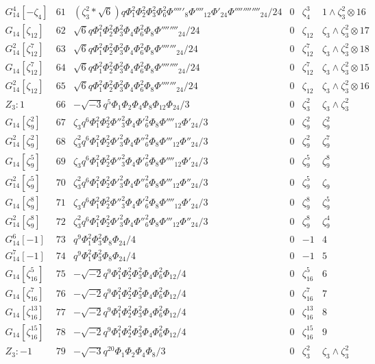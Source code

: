 \documentclass{article}
\begin{document}
$$\begin{array}{c|ccccc}
G_{14}^4[-\zeta_4]&61&(\zeta_3^2*\sqrt{6})q\Phi_1^2\Phi_2^2\Phi_3^2\Phi_6^2\Phi'''''_8\Phi''''_{12}\Phi'_{24}\Phi''''''''''''_{24}/24&0&\zeta_4^3&1\!\wedge\!\zeta_3^2\otimes16\\
G_{14}[\zeta_{12}]&62&\sqrt{6}q\Phi_1^2\Phi_2^2\Phi_3^2\Phi_4\Phi_6^2\Phi_8\Phi''''''''_{24}/24&0&\zeta_{12}&\zeta_3\!\wedge\!\zeta_3^2\otimes17\\
G_{14}^2[\zeta_{12}^7]&63&\sqrt{6}q\Phi_1^2\Phi_2^2\Phi_3^2\Phi_4\Phi_6^2\Phi_8\Phi'''''''_{24}/24&0&\zeta_{12}^7&\zeta_3\!\wedge\!\zeta_3^2\otimes18\\
G_{14}[\zeta_{12}^7]&64&\sqrt{6}q\Phi_1^2\Phi_2^2\Phi_3^2\Phi_4\Phi_6^2\Phi_8\Phi''''''''_{24}/24&0&\zeta_{12}^7&\zeta_3\!\wedge\!\zeta_3^2\otimes15\\
G_{14}^2[\zeta_{12}]&65&\sqrt{6}q\Phi_1^2\Phi_2^2\Phi_3^2\Phi_4\Phi_6^2\Phi_8\Phi'''''''_{24}/24&0&\zeta_{12}&\zeta_3\!\wedge\!\zeta_3^2\otimes16\\
Z_3:1&66&-\sqrt{-3}q^5\Phi_1\Phi_2\Phi_4\Phi_8\Phi_{12}\Phi_{24}/3&0&\zeta_3^2&\zeta_3\!\wedge\!\zeta_3^2\\
G_{14}[\zeta_9^2]&67&\zeta_3q^6\Phi_1^2\Phi_2^2\Phi''_3^2\Phi_4\Phi'_6^2\Phi_8\Phi''''_{12}\Phi'_{24}/3&0&\zeta_9^2&\zeta_9^2\\
G_{14}^2[\zeta_9^2]&68&\zeta_3^2q^6\Phi_1^2\Phi_2^2\Phi'_3^2\Phi_4\Phi''_6^2\Phi_8\Phi'''_{12}\Phi''_{24}/3&0&\zeta_9^2&\zeta_9^7\\
G_{14}[\zeta_9^5]&69&\zeta_3q^6\Phi_1^2\Phi_2^2\Phi''_3^2\Phi_4\Phi'_6^2\Phi_8\Phi''''_{12}\Phi'_{24}/3&0&\zeta_9^5&\zeta_9^8\\
G_{14}^2[\zeta_9^5]&70&\zeta_3^2q^6\Phi_1^2\Phi_2^2\Phi'_3^2\Phi_4\Phi''_6^2\Phi_8\Phi'''_{12}\Phi''_{24}/3&0&\zeta_9^5&\zeta_9\\
G_{14}[\zeta_9^8]&71&\zeta_3q^6\Phi_1^2\Phi_2^2\Phi''_3^2\Phi_4\Phi'_6^2\Phi_8\Phi''''_{12}\Phi'_{24}/3&0&\zeta_9^8&\zeta_9^5\\
G_{14}^2[\zeta_9^8]&72&\zeta_3^2q^6\Phi_1^2\Phi_2^2\Phi'_3^2\Phi_4\Phi''_6^2\Phi_8\Phi'''_{12}\Phi''_{24}/3&0&\zeta_9^8&\zeta_9^4\\
G_{14}^6[-1]&73&q^9\Phi_1^2\Phi_3^2\Phi_8\Phi_{24}/4&0&-1&4\\
G_{14}^7[-1]&74&q^9\Phi_1^2\Phi_3^2\Phi_8\Phi_{24}/4&0&-1&5\\
G_{14}[\zeta_{16}^5]&75&-\sqrt{-2}q^9\Phi_1^2\Phi_2^2\Phi_3^2\Phi_4\Phi_6^2\Phi_{12}/4&0&\zeta_{16}^5&6\\
G_{14}[\zeta_{16}^7]&76&-\sqrt{-2}q^9\Phi_1^2\Phi_2^2\Phi_3^2\Phi_4\Phi_6^2\Phi_{12}/4&0&\zeta_{16}^7&7\\
G_{14}[\zeta_{16}^{13}]&77&-\sqrt{-2}q^9\Phi_1^2\Phi_2^2\Phi_3^2\Phi_4\Phi_6^2\Phi_{12}/4&0&\zeta_{16}^{13}&8\\
G_{14}[\zeta_{16}^{15}]&78&-\sqrt{-2}q^9\Phi_1^2\Phi_2^2\Phi_3^2\Phi_4\Phi_6^2\Phi_{12}/4&0&\zeta_{16}^{15}&9\\
Z_3:-1&79&-\sqrt{-3}q^{20}\Phi_1\Phi_2\Phi_4\Phi_8/3&0&\zeta_3^2&\zeta_3\!\wedge\!\zeta_3^2\\
\end{array}
$$
\end{document}
